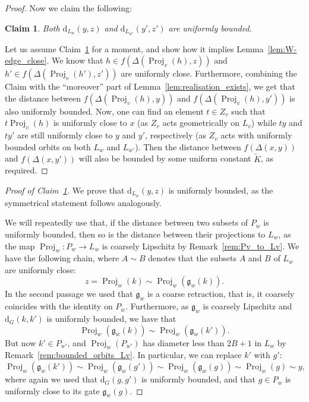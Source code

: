 \documentclass[svgnames]{amsart}
\theoremstyle{plain}
\newtheorem{claim}[thm]{Claim}
\theoremstyle{definition}
\newenvironment{claimproof}{\renewcommand{\qedsymbol}{$\blacksquare$}\begin{proof}}{\end{proof}}
\newcommand{\dist}{\mathrm{d}}
\newcommand{\Proj}{\operatorname{Proj}}
\newcommand{\gate}{\mathfrak{g}}
\begin{document}
\begin{proof}
    Now we claim the following:
    \begin{claim}\label{claim:W-edge_close_gate_does_not_change}
        Both $\dist_{L_{w}}(y, z)$ and $\dist_{L_{w'}}(y', z')$ are uniformly bounded.
    \end{claim}
    Let us assume Claim~\ref{claim:W-edge_close_gate_does_not_change} for a moment, and show how it implies Lemma~\ref{lem:W-edge_close}. We know that $h\in f(\Delta(\Proj_v(h), z))$ and $h'\in f(\Delta(\Proj_v(h'), z'))$ are uniformly close. Furthermore, combining the Claim with the “moreover” part of Lemma~\ref{lem:realisation_exists}, we get that the distance between $f(\Delta(\Proj_v(h), y))$ and $f(\Delta(\Proj_v(h), y'))$ is also uniformly bounded. Now, one can find an element $t\in Z_v$ such that $t\Proj_v(h)$ is uniformly close to $x$ (as $Z_v$ acts geometrically on $L_v$) while $ty$ and $ty'$ are still uniformly close to $y$ and $y'$, respectively (as $Z_v$ acts with uniformly bounded orbits on both $L_w$ and $L_{w'}$). Then the distance between $f(\Delta(x, y))$ and $f(\Delta(x, y'))$ will also be bounded by some uniform constant $\widetilde{K}$, as required. 
\end{proof}

    \begin{claimproof}[Proof of Claim~\ref{claim:W-edge_close_gate_does_not_change}]
        We prove that $\dist_{L_{w}}(y, z)$ is uniformly bounded, as the symmetrical statement follows analogously. 
        
        We will repeatedly use that, if the distance between two subsets of $P_w$ is uniformly bounded, then so is the distance between their projections to $L_w$, as the map $\Proj_w\colon P_w\to L_w$ is coarsely Lipschitz by Remark~\ref{rem:Pv_to_Lv}. We have the following chain, where $A\sim B$ denotes that the subsets $A$ and $B$ of $L_w$ are uniformly close:
        $$z=\Proj_w(k)\sim \Proj_w(\gate_w(k)).$$
        In the second passage we used that $\gate_w$ is a coarse retraction, that is, it coarsely coincides with the identity on $P_w$. Furthermore, as $\gate_w$ is coarsely Lipschitz and $\dist_G(k,k')$ is uniformly bounded, we have that
        $$\Proj_w(\gate_w(k))\sim \Proj_w(\gate_w(k')).$$
        But now $k'\in P_{w'}$, and $\Proj_w(P_{w'})$ has diameter less than $2B+1$ in $L_w$ by Remark~\ref{rem:bounded_orbits_Lv}. In particular, we can replace $k'$ with $g'$:
        $$\Proj_w(\gate_w(k'))\sim \Proj_w(\gate_w(g'))\sim \Proj_w(\gate_w(g))\sim \Proj_w(g)\sim y,$$
        where again we used that $\dist_G(g, g')$ is uniformly bounded, and that $g\in P_w$ is uniformly close to its gate $\gate_w(g)$. 
    \end{claimproof}
\end{document}
